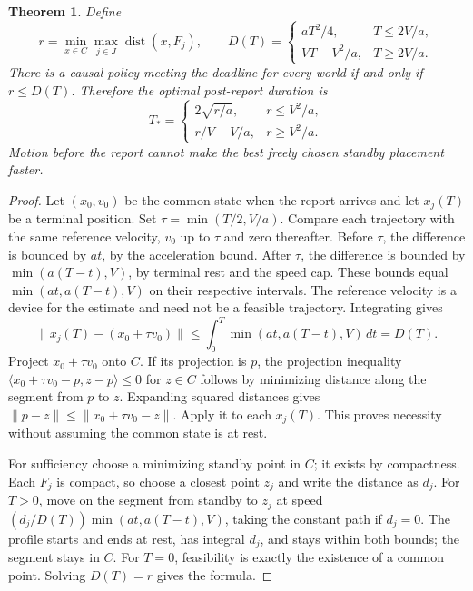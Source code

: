 \documentclass[11pt]{article}
\newtheorem{theorem}{Theorem}
\begin{document}
\begin{theorem}
Define
\[
 r=\min_{x\in C}\max_{j\in J}\operatorname{dist}(x,F_j),\qquad
 D(T)=
 \begin{cases}
 aT^2/4, & T\le 2V/a,\\
 VT-V^2/a, & T\ge 2V/a .
 \end{cases}
\]
There is a causal policy meeting the deadline for every world if and only
if \(r\le D(T)\). Therefore the optimal post-report duration is
\[
 T_*=
 \begin{cases}
 2\sqrt{r/a}, & r\le V^2/a,\\
 r/V+V/a, & r\ge V^2/a .
 \end{cases}
\]
Motion before the report cannot make the best freely chosen standby
placement faster.
\end{theorem}
\begin{proof}
Let \((x_0,v_0)\) be the common state when the report arrives and let
\(x_j(T)\) be a terminal position. Set \(\tau=\min(T/2,V/a)\).
Compare each trajectory with the same reference velocity, \(v_0\) up to
\(\tau\) and zero thereafter. Before \(\tau\), the difference is bounded
by \(at\), by the acceleration bound. After \(\tau\), the difference is
bounded by \(\min(a(T-t),V)\), by terminal rest and the speed cap.
These bounds equal \(\min(at,a(T-t),V)\) on their respective intervals.
The reference velocity is a device for the estimate and need not be a
feasible trajectory. Integrating gives
\[
 \|x_j(T)-(x_0+\tau v_0)\|
 \le \int_0^T\min(at,a(T-t),V)\,dt
 =D(T).
\]
Project \(x_0+\tau v_0\) onto \(C\). If its projection is \(p\), the
projection inequality \(\langle x_0+\tau v_0-p,z-p\rangle\le 0\) for
\(z\in C\) follows by minimizing distance along the segment from \(p\) to
\(z\). Expanding squared distances gives
\(\|p-z\|\le\|x_0+\tau v_0-z\|\). Apply it to each \(x_j(T)\). This
proves necessity without assuming the common state is at rest.

For sufficiency choose a minimizing standby point in \(C\); it exists
by compactness. Each \(F_j\) is compact, so choose a closest point
\(z_j\) and write the distance as \(d_j\). For \(T>0\), move on the
segment from standby to \(z_j\) at speed
\((d_j/D(T))\min(at,a(T-t),V)\), taking the constant path if \(d_j=0\).
The profile starts and ends at rest, has integral \(d_j\), and stays
within both bounds; the segment stays in \(C\). For \(T=0\), feasibility
is exactly the existence of a common point. Solving \(D(T)=r\)
gives the formula.
\end{proof}
\end{document}

